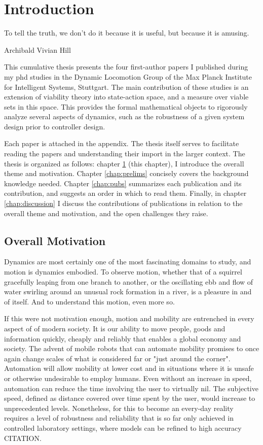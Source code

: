 
\chapter{Introduction} \label{chap:intro}
\epigraph{To tell the truth, we don't do it because it is useful, but because it is amusing.}{Archibald Vivian Hill}

This cumulative thesis presents the four first-author papers I published during my phd studies in the Dynamic Locomotion Group of the Max Planck Institute for Intelligent Systems, Stuttgart. The main contribution of these studies is an extension of viability theory into state-action space, and a measure over viable sets in this space. This provides the formal mathematical objects to rigorously analyze several aspects of dynamics, such as the robustness of a given system design prior to controller design. \par
Each paper is attached in the appendix. The thesis itself serves to facilitate reading the papers and understanding their import in the larger context. The thesis is organized as follows: chapter \ref{chap:intro} (this chapter), I introduce the overall theme and motivation.
Chapter \ref{chap:prelims} concisely covers the background knowledge needed.
Chapter \ref{chap:pubs} summarizes each publication and its contribution, and suggests an order in which to read them.
Finally, in chapter \ref{chap:discussion} I discuss the contributions of publications in relation to the overall theme and motivation, and the open challenges they raise.

\section{Overall Motivation}

Dynamics are most certainly one of the most fascinating domains to study, and motion is dynamics embodied. To observe motion, whether that of a squirrel gracefully leaping from one branch to another, or the oscillating ebb and flow of water swirling around an unusual rock formation in a river, is a pleasure in and of itself. And to understand this motion, even more so. \par

If this were not motivation enough, motion and mobility are entrenched in every aspect of of modern society. It is our ability to move people, goods and information quickly, cheaply and reliably that enables a global economy and society. The advent of mobile robots that can automate mobility promises to once again change scales of what is considered far or "just around the corner". Automation will allow mobility at lower cost and in situations where it is unsafe or otherwise undesirable to employ humans. Even without an increase in speed, automation can reduce the time involving the user to virtually nil. The subjective speed, defined as distance covered over time spent by the user, would increase to unprecedented levels. Nonetheless, for this to become an every-day reality requires a level of robustness and reliability that is so far only achieved in controlled laboratory settings, where models can be refined to high accuracy CITATION. \par

